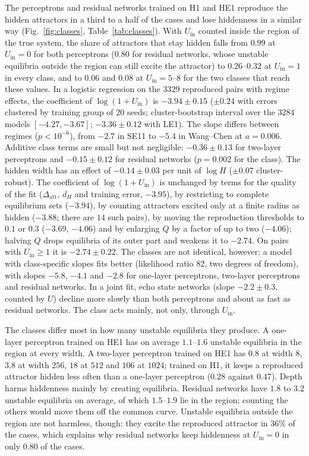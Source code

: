 \documentclass[aip,cha,reprint,amsmath,amssymb,longbibliography]{revtex4-2}
\theoremstyle{definition}
\newcommand{\Uin}{U_{\mathrm{in}}}
\begin{document}
The perceptrons and residual networks trained on H1 and HE1 reproduce the hidden attractors in a third to a half of the
cases and lose hiddenness in a similar way (Fig.~\ref{fig:classes}, Table~\ref{tab:classes}). With $\Uin$ counted inside the
region of the true system, the share of attractors that stay hidden falls from $0.99$ at $\Uin=0$ for both perceptrons
($0.80$ for residual networks, whose unstable equilibria outside the region can still excite the attractor) to
$0.26$--$0.32$ at $\Uin=1$ in every class, and to $0.06$ and $0.08$ at $\Uin=5$--$8$ for the two classes that reach these
values. In a logistic regression on the $3329$ reproduced pairs with regime effects, the coefficient of $\log(1+\Uin)$ is
$-3.94\pm0.15$ ($\pm0.24$ with errors clustered by training group of $20$ seeds; cluster-bootstrap interval over the
$3284$ models $[-4.27,-3.67]$; $-3.36\pm0.12$ with LE1). The slope differs between regimes ($p<10^{-6}$), from $-2.7$
in SE11 to $-5.4$ in Wang--Chen at $a=0.006$. Additive class terms are small but not negligible:
$-0.36\pm0.13$ for two-layer perceptrons and $-0.15\pm0.12$ for residual networks ($p=0.002$ for the class). The hidden width
has an effect of $-0.14\pm0.03$ per unit of $\log H$ ($\pm0.07$ cluster-robust). The coefficient of $\log(1+\Uin)$ is
unchanged by terms for the quality of the fit ($\Delta_{\mathrm{att}}$, $d_H$ and training error, $-3.95$), by restricting
to complete equilibrium sets ($-3.94$), by counting attractors excited only at a finite radius as hidden ($-3.88$; there
are $14$ such pairs), by moving the reproduction thresholds to $0.1$ or $0.3$ ($-3.69$, $-4.06$) and by enlarging $Q$ by a
factor of up to two ($-4.06$); halving $Q$ drops equilibria of its outer part and weakens it to $-2.74$. On pairs with
$\Uin\ge1$ it is $-2.74\pm0.22$. The classes are not identical, however: a model with class-specific slopes fits
better (likelihood ratio $82$, two degrees of freedom), with slopes $-5.8$, $-4.1$ and $-2.8$ for one-layer perceptrons,
two-layer perceptrons and residual networks. In a joint fit, echo state networks (slope $-2.2\pm0.3$, counted by $U$)
decline more slowly than both perceptrons and about as fast as residual networks. The class acts mainly, not only,
through $\Uin$.

The classes differ most in how many unstable equilibria they produce. A one-layer perceptron trained on HE1 has on average
$1.1$--$1.6$ unstable equilibria in the region at every width. A two-layer perceptron trained on HE1 has $0.8$ at width $8$,
$3.8$ at width $256$, $18$ at $512$ and $106$ at $1024$; trained on H1, it keeps a reproduced attractor hidden less often
than a one-layer perceptron ($0.28$ against $0.47$). Depth harms hiddenness mainly by creating equilibria. Residual networks have $1.8$ to $3.2$ unstable equilibria on
average, of which $1.5$--$1.9$ lie in the region; counting the others would move them off the common curve. Unstable
equilibria outside the region are not harmless, though: they excite the reproduced attractor in $36\%$ of the cases, which
explains why residual networks keep hiddenness at $\Uin=0$ in only $0.80$ of the cases.
\end{document}
